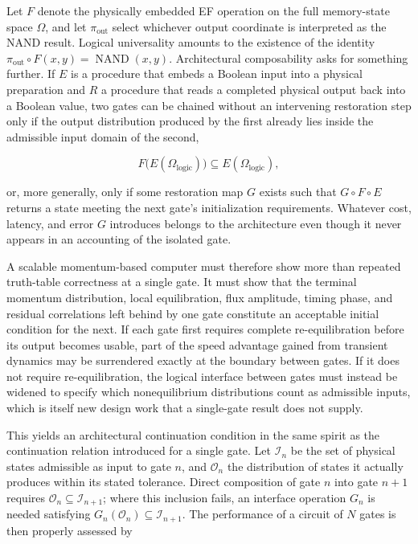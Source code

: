 \documentclass[11pt]{article}
\begin{document}
Let $F$ denote the physically embedded EF operation on the full memory-state space $\Omega$, and let $\pi_{\mathrm{out}}$ select whichever output coordinate is interpreted as the NAND result. Logical universality amounts to the existence of the identity $\pi_{\mathrm{out}}\circ F(x,y) = \operatorname{NAND}(x,y)$. Architectural composability asks for something further. If $E$ is a procedure that embeds a Boolean input into a physical preparation and $R$ a procedure that reads a completed physical output back into a Boolean value, two gates can be chained without an intervening restoration step only if the output distribution produced by the first already lies inside the admissible input domain of the second,

\[
F\bigl(E(\Omega_{\mathrm{logic}})\bigr) \subseteq E(\Omega_{\mathrm{logic}}),
\]

or, more generally, only if some restoration map $G$ exists such that $G\circ F\circ E$ returns a state meeting the next gate's initialization requirements. Whatever cost, latency, and error $G$ introduces belongs to the architecture even though it never appears in an accounting of the isolated gate.

A scalable momentum-based computer must therefore show more than repeated truth-table correctness at a single gate. It must show that the terminal momentum distribution, local equilibration, flux amplitude, timing phase, and residual correlations left behind by one gate constitute an acceptable initial condition for the next. If each gate first requires complete re-equilibration before its output becomes usable, part of the speed advantage gained from transient dynamics may be surrendered exactly at the boundary between gates. If it does not require re-equilibration, the logical interface between gates must instead be widened to specify which nonequilibrium distributions count as admissible inputs, which is itself new design work that a single-gate result does not supply.

This yields an architectural continuation condition in the same spirit as the continuation relation introduced for a single gate. Let $\mathcal I_n$ be the set of physical states admissible as input to gate $n$, and $\mathcal O_n$ the distribution of states it actually produces within its stated tolerance. Direct composition of gate $n$ into gate $n+1$ requires $\mathcal O_n \subseteq \mathcal I_{n+1}$; where this inclusion fails, an interface operation $G_n$ is needed satisfying $G_n(\mathcal O_n)\subseteq\mathcal I_{n+1}$. The performance of a circuit of $N$ gates is then properly assessed by
\end{document}
